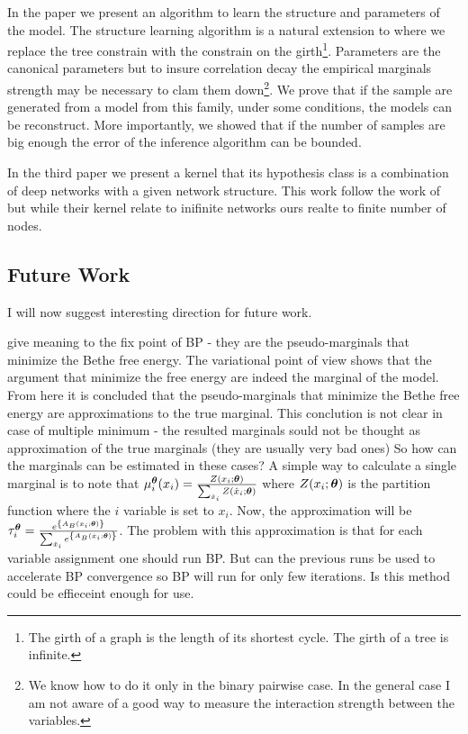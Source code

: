 In the paper we present an algorithm to learn the structure and parameters of the model.
The structure learning algorithm is a natural extension to \cite{chowLiu} where we replace the tree constrain with the constrain on the girth\footnote{The girth of a graph is the length of its shortest cycle. The girth of a tree is infinite.}.
Parameters are the canonical parameters but to insure correlation decay the empirical marginals strength may be necessary to clam them down\footnote{We know how to do it only in the binary pairwise case. In the general case I am not aware of a good way to measure the interaction strength between the variables.}.
We prove that if the sample are generated from a model from this family, under some conditions, the models can be reconstruct.
More importantly, we showed that if the number of samples are big enough the error of the inference algorithm can be bounded.

In the third paper  we present a kernel that its hypothesis class is a combination of deep networks with a given network structure. This work follow the work of \cite{cho2009kernel} but while their kernel relate to inifinite networks ours realte to finite number of nodes.

\subsection{Future Work}
I will now suggest interesting direction for future work.

 give meaning to the fix point of BP - they are the pseudo-marginals that minimize the Bethe free energy.  
The variational point of view shows that the argument that minimize the free energy are indeed the marginal of the model.
From here it is concluded that the pseudo-marginals that minimize the Bethe free energy are approximations to the true marginal.
This conclution is not clear in case of multiple minimum - the resulted marginals sould not be thought as approximation of the true marginals (they are usually very bad ones)
So how can the marginals can be estimated in these cases?
A simple way to calculate a single marginal is to note that $\mu_i^{\boldsymbol{\theta}}(x_i) = \frac{Z(x_i;\boldsymbol{\theta})}{\sum_{\hat{x}_i}Z(\hat{x}_i;\boldsymbol{\theta})}$  where $Z(x_i;\boldsymbol{\theta})$%
is the partition function where the $i$ variable is set to $x_i$.
Now, the approximation will be $\tau_i^{\boldsymbol{\theta}} = \frac{e^{\left\{A_B(x_i;\boldsymbol{\theta})\right\}}}{\sum_{\hat{x}_i}e^{\left\{A_B(\hat{x}_i;\boldsymbol{\theta})\right\}}}$.
The problem with this approximation is that for each variable assignment one should run BP.
But can the previous runs be used to accelerate BP convergence so BP will run for only few iterations.
Is this method could be effieceint enough for use.

